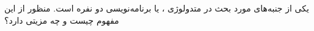 یکی از جنبه‌های مورد بحث در متدولوژی
،
 یا برنامه‌نویسی دو نفره است. منظور از این مفهوم چیست و چه مزیتی دارد؟

